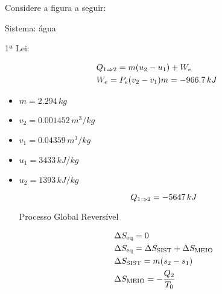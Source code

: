 \documentclass[a4paper,12pt]{memoir}
\begin{document}
\begin{Exerc}[8.117 6\pa Ed.]
Considere a figura a seguir:


\end{Exerc}

\begin{sol}


Sistema: água

1ª Lei: 

\[
\begin{gathered}
  Q_{1 \imp 2} = m(u_2 - u_1) + W_e \hfill \\
  W_e = P_e (v_2 - v_1) m = -966.7\,kJ \hfill \\ 
\end{gathered} 
\]

\begin{itemize}
\item $m = 2.294\,kg$
\item $v_2 = 0.001452\,m^3/kg$
\item $v_1 = 0.04359\,m^3/kg$
\item $u_1 = 3433\,kJ/kg$
\item $u_2 = 1393\,kJ/kg$

\[
Q_{1 \Rightarrow 2} = -5647\,kJ
\]

Processo Global Reversível

\[
\begin{gathered}
  \Delta S_{\text{eq}} = 0 \hfill \\
  \Delta S_{\text{eq}} = \Delta S_{\text{SIST}} + \Delta S_{\text{MEIO}} \hfill \\
  \Delta S_{\text{SIST}} = m(s_2 - s_1) \hfill \\
  \Delta S_{\text{MEIO}} = -\frac{Q_2}{T_0} \hfill \\ 
\end{gathered} 
\]

\end{itemize}

\end{sol}
\end{document}
